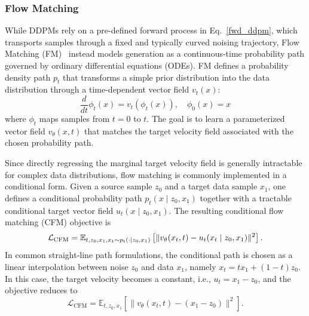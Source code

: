 \documentclass[lettersize,journal]{IEEEtran}
\begin{document}
\subsubsection{Flow Matching}
While DDPMs rely on a pre-defined forward process in Eq.~\eqref{fwd_ddpm}, which transports samples through a fixed and typically curved noising trajectory, Flow Matching (FM)~\cite{lipman2023flow,liu2024instaflow} instead models generation as a continuous-time probability path governed by ordinary differential equations (ODEs). FM defines a probability density path $p_t$ that transforms a simple prior distribution into the data distribution through a time-dependent vector field $v_t(x)$:
\begin{equation}
\frac{d}{dt} \phi_t(x) = v_t(\phi_t(x)), \quad \phi_0(x) = x
\end{equation}
where $\phi_t$ maps samples from $t=0$ to $t$. The goal is to learn a parameterized vector field $v_\theta(x,t)$ that matches the target velocity field associated with the chosen probability path.

Since directly regressing the marginal target velocity field is generally intractable for complex data distributions, flow matching is commonly implemented in a conditional form. Given a source sample $z_0$ and a target data sample $x_1$, one defines a conditional probability path $p_t(x \mid z_0, x_1)$ together with a tractable conditional target vector field $u_t(x \mid z_0, x_1)$. The resulting conditional flow matching (CFM) objective is
\begin{equation}
\small
\mathcal{L}_{\text{CFM}}
=
\mathbb{E}_{t, z_0, x_1, x_t \sim p_t(\cdot \mid z_0,x_1)}
\left[
\| v_\theta(x_t,t)-u_t(x_t \mid z_0,x_1)\|^2
\right].
\end{equation}
In common straight-line path formulations, the conditional path is chosen as a linear interpolation between noise $z_0$ and data $x_1$, namely $x_t = t x_1 + (1-t) z_0$. In this case, the target velocity becomes a constant, i.e., $u_t = x_1 - z_0$, and the objective reduces to
\begin{equation}
\mathcal{L}_{\text{CFM}} = \mathbb{E}_{t,z_0,x_1} \left[ \| v_\theta(x_t, t) - (x_1 - z_0) \|^2 \right].
\end{equation}

\end{document}
